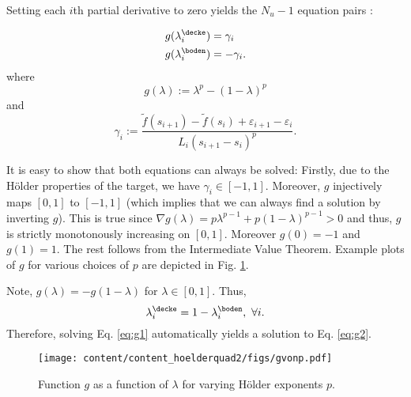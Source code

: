 Setting each $i$th partial derivative to zero yields the $N_u-1$ equation pairs :


\begin{align}
g(\lambda_i^\decke) &= \gamma_i \label{eq:g1}\\
   g(\lambda_i^\boden) &= -\gamma_i. \label{eq:g2}
\end{align}
where \[g(\lambda) := \lambda^p- (1-\lambda )^p \] and \[\gamma_i := \frac{\tilde f(s_{i+1}) - \tilde f(s_i) + \varepsilon_{i+1} - \varepsilon_i}{ L_i   (s_{i+1}-s_i )^p}.\]

It is easy to show that both equations can always be solved: Firstly, due to the H\"older properties of the target, we have $\gamma_i \in [-1,1]$. Moreover, $g$ injectively maps $[0,1]$ to $[-1,1]$ (which implies that we can always find a solution by inverting $g$). This is true since $\nabla g (\lambda) = p \lambda^{p-1} + p (1-\lambda)^{p-1} >0 $ and thus, $g$ is strictly monotonously increasing on $[0,1]$. Moreover $g(0) = -1$ and $g(1) = 1$. The rest follows from the Intermediate Value Theorem. Example plots of $g$ for various choices of $p$ are depicted in Fig. \ref{fig:gvonp}. 

Note,
$g(\lambda) = - g(1-\lambda) $ for $\lambda \in [0,1]$. Thus, 
\begin{equation} \lambda_i^\decke = 1 - \lambda_i^\boden,\,\,\forall i. \end{equation} Therefore, solving Eq. \ref{eq:g1} automatically yields a solution to Eq. \ref{eq:g2}.


\begin{figure}[htb] \label{fig:gvonp}
	\centering
		\texttt{[image: content/content\_hoelderquad2/figs/gvonp.pdf]}
	\caption{Function $g$ as a function of $\lambda$ for varying H\"older exponents $p$.}
\end{figure}


